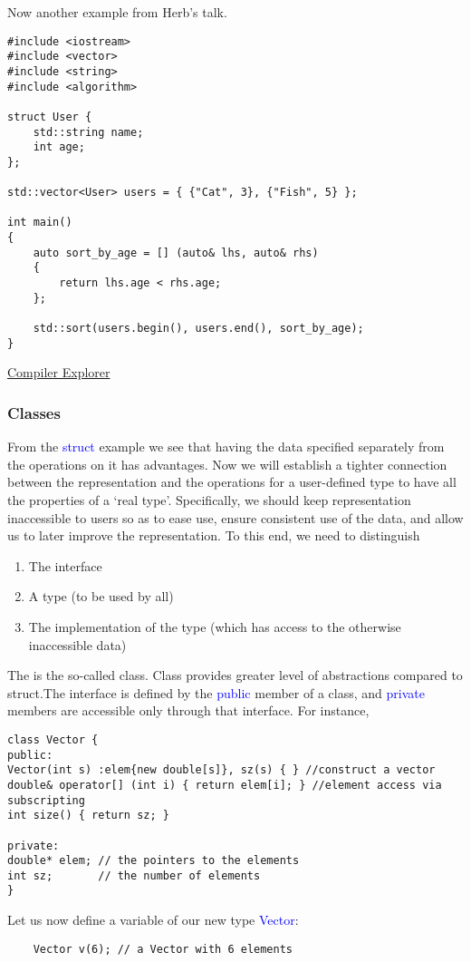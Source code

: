 \documentclass{article}
\newcommand{\be}[1]{\textcolor{blue}{#1}}
\begin{document}
Now another example from Herb's talk.
\begin{verbatim}
#include <iostream>
#include <vector>
#include <string>
#include <algorithm>

struct User {
    std::string name;
    int age;
};

std::vector<User> users = { {"Cat", 3}, {"Fish", 5} };

int main()
{
    auto sort_by_age = [] (auto& lhs, auto& rhs)
    {
        return lhs.age < rhs.age;
    };

    std::sort(users.begin(), users.end(), sort_by_age);
}
\end{verbatim}
\href{https://godbolt.org/z/noea68}{Compiler Explorer}

\subsubsection{Classes}
From the \be{struct} example we see that having the data specified separately from the operations on it 
has advantages. Now we will establish a tighter connection between the representation and the operations for a user-defined type to have all the properties of a `real type'. Specifically, we should keep representation inaccessible to users so as to ease use, ensure consistent use of the data, and allow us to later improve the representation. To this end, we need to distinguish
\begin{enumerate}
	\item The interface
	\item A type (to be used by all)
	\item The implementation of the type (which has access to the otherwise inaccessible data)
\end{enumerate}
The is the so-called class. Class provides greater level of abstractions compared to struct.The interface is defined by the \be{public} member of a class, and \be{private} members are accessible only through that interface. For instance,
\begin{verbatim}
class Vector {
public:
Vector(int s) :elem{new double[s]}, sz(s) { } //construct a vector
double& operator[] (int i) { return elem[i]; } //element access via subscripting
int size() { return sz; }

private:
double* elem; // the pointers to the elements
int sz;       // the number of elements	
}
\end{verbatim}
Let us now define a variable of our new type \be{Vector}:
\begin{verbatim}
	Vector v(6); // a Vector with 6 elements
\end{verbatim}
\end{document}
